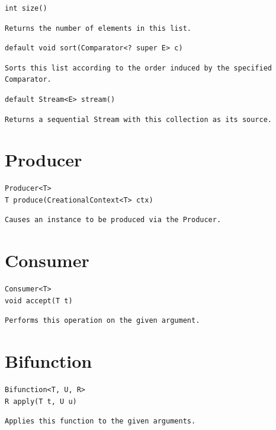 \documentclass[5pt, portrait]{article}
\begin{document}
\begin{verbatim}
int size()
\end{verbatim}
\begin{verbatim}
Returns the number of elements in this list.
\end{verbatim}

\begin{verbatim}
default void sort(Comparator<? super E> c)
\end{verbatim}
\begin{verbatim}
Sorts this list according to the order induced by the specified Comparator.
\end{verbatim}

\begin{verbatim}
default Stream<E> stream()
\end{verbatim}
\begin{verbatim}
Returns a sequential Stream with this collection as its source.
\end{verbatim}

\section{Producer}
\begin{verbatim}
Producer<T>
T produce(CreationalContext<T> ctx)
\end{verbatim}
\begin{verbatim}
Causes an instance to be produced via the Producer.
\end{verbatim}

\section{Consumer}
\begin{verbatim}
Consumer<T>
void accept(T t)
\end{verbatim}
\begin{verbatim}
Performs this operation on the given argument.
\end{verbatim}

\section{Bifunction}
\begin{verbatim}
Bifunction<T, U, R>
R apply(T t, U u)
\end{verbatim}
\begin{verbatim}
Applies this function to the given arguments.
\end{verbatim}
\end{document}
